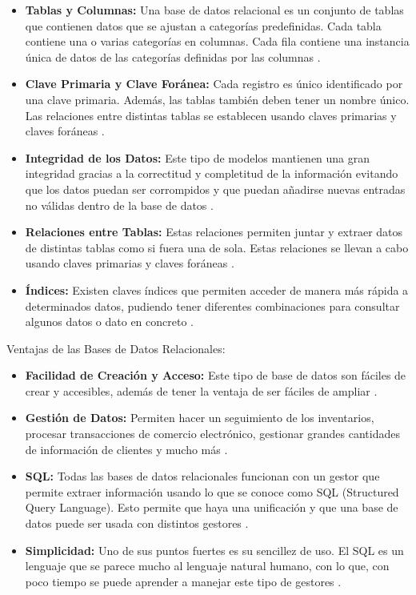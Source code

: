 \begin{itemize}
    \item \textbf{Tablas y Columnas:} Una base de datos relacional es un conjunto de tablas que contienen datos que se ajustan a categorías predefinidas. Cada tabla contiene una o varias categorías en columnas. Cada fila contiene una instancia única de datos de las categorías definidas por las columnas \cite{base2}.

\item \textbf{Clave Primaria y Clave Foránea:} Cada registro es único identificado por una clave primaria. Además, las tablas también deben tener un nombre único. Las relaciones entre distintas tablas se establecen usando claves primarias y claves foráneas \cite{base4}.

\item \textbf{Integridad de los Datos:} Este tipo de modelos mantienen una gran integridad gracias a la correctitud y completitud de la información evitando que los datos puedan ser corrompidos y que puedan añadirse nuevas entradas no válidas dentro de la base de datos \cite{base4}.

\item \textbf{Relaciones entre Tablas:} Estas relaciones permiten juntar y extraer datos de distintas tablas como si fuera una de sola. Estas relaciones se llevan a cabo usando claves primarias y claves foráneas  \cite{base4}.

\item \textbf{Índices:} Existen claves índices que permiten acceder de manera más rápida a determinados datos, pudiendo tener diferentes combinaciones para consultar algunos datos o dato en concreto \cite{base1}.
 
\end{itemize}
Ventajas de las Bases de Datos Relacionales:
 \begin{itemize}
     \item \textbf{Facilidad de Creación y Acceso: }Este tipo de base de datos son fáciles de crear y accesibles, además de tener la ventaja de ser fáciles de ampliar \cite{base2}.

\item \textbf{Gestión de Datos: }Permiten hacer un seguimiento de los inventarios, procesar transacciones de comercio electrónico, gestionar grandes cantidades de información de clientes y mucho más \cite{base2}.

\item \textbf{SQL: }Todas las bases de datos relacionales funcionan con un gestor que permite extraer información usando lo que se conoce como SQL (Structured Query Language). Esto permite que haya una unificación y que una base de datos puede ser usada con distintos gestores \cite{base4}.
\item \textbf{Simplicidad:} Uno de sus puntos fuertes es su sencillez de uso. El SQL es un lenguaje que se parece mucho al lenguaje natural humano, con lo que, con poco tiempo se puede aprender a manejar este tipo de gestores \cite{base4}.
\end{itemize}
